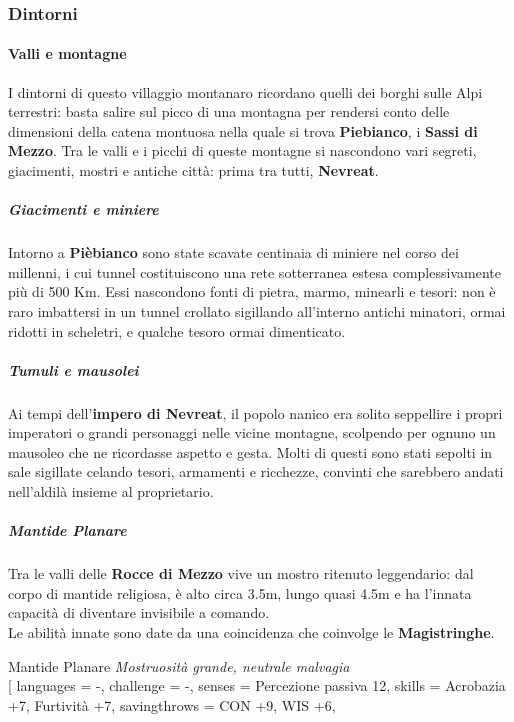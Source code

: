 \documentclass[10pt,twoside,onecolumn,openany]{book}
\begin{document}
\subsubsection{Dintorni}
\begin{multicols}{2}
\paragraph{Valli e montagne} I dintorni di questo villaggio montanaro ricordano quelli dei borghi sulle Alpi terrestri: basta salire sul picco di una montagna per rendersi conto delle dimensioni della catena montuosa nella quale si trova \textbf{Piebianco}, i \textbf{Sassi di Mezzo}. Tra le valli e i picchi di queste montagne si nascondono vari segreti, giacimenti, mostri e antiche città: prima tra tutti, \textbf{Nevreat}.
\subparagraph{Giacimenti e miniere} Intorno a \textbf{Pièbianco} sono state scavate centinaia di miniere nel corso dei millenni, i cui tunnel costituiscono una rete sotterranea estesa complessivamente più di 500 Km. Essi nascondono fonti di pietra, marmo, minearli e tesori: non è raro imbattersi in un tunnel crollato sigillando all'interno antichi minatori, ormai ridotti in scheletri, e qualche tesoro ormai dimenticato.
\subparagraph{Tumuli e mausolei} Ai tempi dell'\textbf{impero di Nevreat}, il popolo nanico era solito seppellire i propri imperatori o grandi personaggi nelle vicine montagne, scolpendo per ognuno un mausoleo che ne ricordasse aspetto e gesta. Molti di questi sono stati sepolti in sale sigillate celando tesori, armamenti e ricchezze, convinti che sarebbero andati nell'aldilà insieme al proprietario.
\subparagraph{Mantide Planare} Tra le valli delle \textbf{Rocce di Mezzo} vive un mostro ritenuto leggendario: dal corpo di mantide religiosa, è alto circa 3.5m, lungo quasi 4.5m e ha l'innata capacità di diventare invisibile a comando.\\
Le abilità innate sono date da una coincidenza che coinvolge le \textbf{Magistringhe}.
\begin{monsterbox}{Mantide Planare}
	\textit{Mostruosità grande, neutrale malvagia}\\
	\hline
	\basics[%
	armorclass = 17 (armatura naturale),
	hitpoints  = 204 (16d12 + 100),
	speed      = 40 ft
	]
	\hline
	\stats[
    STR = \stat{23},
    DEX = \stat{13},
	CON = \stat{20},
	INT = \stat{4},
	WIS = \stat{14},
	CHA = \stat{5}
	]
	\hline
	\details[
	languages = {-},
	challenge = {-},
	senses = {Percezione passiva 12},
	skills = {Acrobazia +7, Furtività +7},
	savingthrows = {CON +9, WIS +6},

\end{monsterbox}
\end{multicols}
\end{document}
